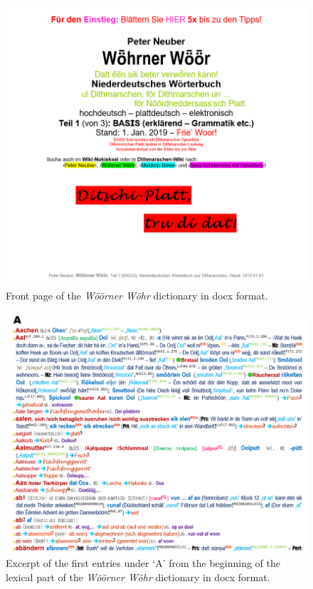 \documentclass{article}
\begin{document}
\begin{figure}
    \centering
    \includegraphics[width=1\linewidth]{woewoe_cover.png}
    \caption{Front page of the \emph{Wöörner Wöhr} dictionary in docx format.}
    \label{fig:enter-label}
\end{figure}

\begin{figure}
    \centering
    \includegraphics[width=1\linewidth]{woewoe_excerpt.png}
    \caption{Excerpt of the first entries under ‘A’ from the beginning of the lexical part of the \emph{Wöörner Wöhr} dictionary in docx format.}
    \label{fig:enter-label}
\end{figure}
\end{document}

